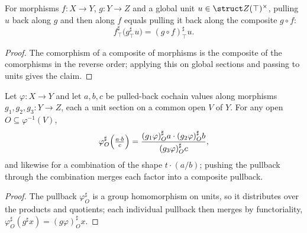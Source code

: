 \begin{lemma}
  \label{lem:units_map_appTop_comp}
  \leanok
  For morphisms \(f \colon X \to Y\), \(g \colon Y \to Z\) and a global unit
  \(u \in \struct Z(\top)^{\times}\), pulling \(u\) back along \(g\) and then along \(f\) equals
  pulling it back along the composite \(g \circ f\):
  \[
    f^{\sharp}_\top\bigl(g^{\sharp}_\top u\bigr) = (g \circ f)^{\sharp}_\top u .
  \]
\end{lemma}
\begin{proof}
  \leanok
  The comorphism of a composite of morphisms is the composite of the comorphisms in the
  reverse order; applying this on global sections and passing to units gives the claim.
\end{proof}

\begin{lemma}
  \label{lem:unitsAppLE_merge}
  \leanok
  Let \(\varphi \colon X \to Y\) and let \(a, b, c\) be pulled-back cochain values along
  morphisms \(g_1, g_2, g_3 \colon Y \to Z\), each a unit section on a common open \(V\) of
  \(Y\). For any open \(O \subseteq \varphi^{-1}(V)\),
  \[
    \varphi^{\sharp}_O\Bigl(\tfrac{a \cdot b}{c}\Bigr)
      = \frac{(g_1\varphi)^{\sharp}_O a \cdot (g_2\varphi)^{\sharp}_O b}{(g_3\varphi)^{\sharp}_O c},
  \]
  and likewise for a combination of the shape \(t \cdot (a/b)\); pushing the pullback through
  the combination merges each factor into a composite pullback.
\end{lemma}
\begin{proof}
  \leanok
  The pullback \(\varphi^{\sharp}_O\) is a group homomorphism on units, so it distributes over
  the products and quotients; each individual pullback then merges by functoriality,
  \(\varphi^{\sharp}_O(g^{\sharp} x) = (g\varphi)^{\sharp}_O x\).
\end{proof}

